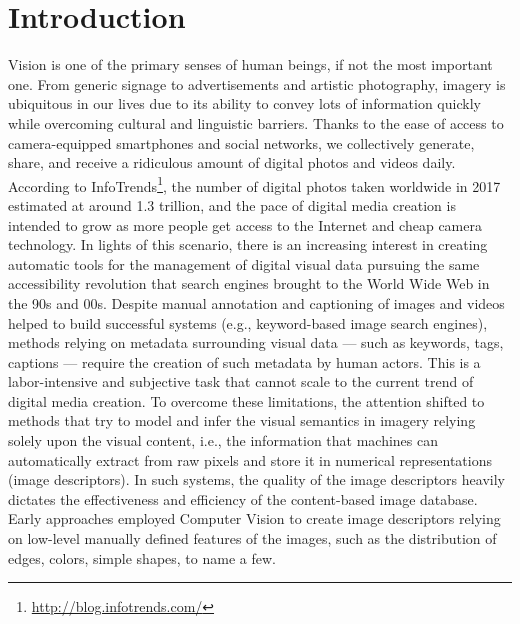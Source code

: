 
\chapter{Introduction}
\label{ch:introduction}

Vision is one of the primary senses of human beings, if not the most important one.
From generic signage to advertisements and artistic photography, imagery is ubiquitous in our lives due to its ability to convey lots of information quickly while overcoming cultural and linguistic barriers.
Thanks to the ease of access to camera-equipped smartphones and social networks, we collectively generate, share, and receive a ridiculous amount of digital photos and videos daily.
According to InfoTrends\footnote{\url{http://blog.infotrends.com/}}, the number of digital photos taken worldwide in 2017 estimated at around 1.3 trillion, and the pace of digital media creation is intended to grow as more people get access to the Internet and cheap camera technology.
In lights of this scenario, there is an increasing interest in creating automatic tools for the management of digital visual data pursuing the same accessibility revolution that search engines brought to the World Wide Web in the 90s and 00s.
Despite manual annotation and captioning of images and videos helped to build successful systems (e.g., keyword-based image search engines), methods relying on metadata surrounding visual data --- such as keywords, tags, captions --- require the creation of such metadata by human actors.
This is a labor-intensive and subjective task that cannot scale to the current trend of digital media creation.
To overcome these limitations, the attention shifted to methods that try to model and infer the visual semantics in imagery relying solely upon the visual content, i.e., the information that machines can automatically extract from raw pixels and store it in numerical representations (image descriptors).
In such systems, the quality of the image descriptors heavily dictates the effectiveness and efficiency of the content-based image database.
Early approaches employed Computer Vision to create image descriptors relying on low-level manually defined features of the images, such as the distribution of edges, colors, simple shapes, to name a few.
